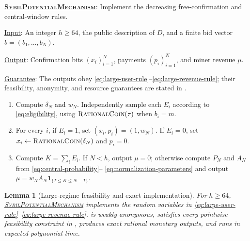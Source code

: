 \documentclass[11pt]{article}
\newenvironment{fminipage}%
  {\begin{Sbox}\begin{minipage}}%
  {\end{minipage}\end{Sbox}\fbox{\TheSbox}}
\newenvironment{algbox}[0]{%
\vskip 0.2in
\noindent
\begin{fminipage}{6.3in}
}{%
\end{fminipage}
\vskip 0.2in
}
\newtheorem{lemma}{Lemma}[section]
\begin{document}
\begin{algbox}
\label{alg:sybil-potential-mechanism}
\textbf{\uline{\textsc{SybilPotentialMechanism}}}: Implement the decreasing
free-confirmation and central-window rules.

\uline{Input}: An integer $h\ge64$, the public description of $D$, and a
finite bid vector $b=(b_1,\ldots,b_N)$.

\uline{Output}: Confirmation bits $(x_i)_{i=1}^N$, payments $(p_i)_{i=1}^N$,
and miner revenue $\mu$.

\uline{Guarantee}: The outputs obey
\eqref{eq:large-user-rule}--\eqref{eq:large-revenue-rule}; their feasibility,
anonymity, and resource guarantees are stated in
.
{\raggedright
\begin{enumerate}
  \item Compute $\delta_N$ and $w_N$.  Independently sample each $E_i$
  according to \eqref{eq:eligibility}, using
  $\text{\textsc{RationalCoin}}(\tau)$ when $b_i=m$.
  \item For every $i$, if $E_i=1$, set $(x_i,p_i)=(1,w_N)$.  If $E_i=0$,
  set $x_i\leftarrow\text{\textsc{RationalCoin}}(\delta_N)$ and $p_i=0$.
  \item Compute $K=\sum_iE_i$.  If $N<h$, output $\mu=0$; otherwise compute
  $P_N$ and $A_N$ from \eqref{eq:central-probability}--
  \eqref{eq:normalization-parameters} and output
  $\mu=w_NA_N\mathbf{1}_{\{T\le K\le N-T\}}$.
\end{enumerate}
\par}
\end{algbox}

\begin{lemma}[Large-regime feasibility and exact implementation]
\label{lem:large-implementation}
For $h\ge64$,
\hyperref[alg:sybil-potential-mechanism]{\textsc{SybilPotentialMechanism}}
implements the random variables in
\eqref{eq:large-user-rule}--\eqref{eq:large-revenue-rule}, is weakly anonymous,
satisfies every pointwise feasibility constraint in , produces
exact rational monetary outputs, and runs in expected polynomial time.
\end{lemma}
\end{document}
